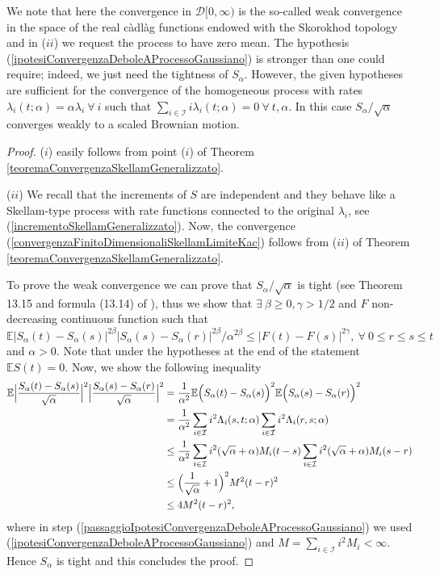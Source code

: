 \documentclass[12pt, twoside, english, headsepline]{article}
\theoremstyle{definition} %
\numberwithin{equation}{section} %
\begin{document}
We note that here the convergence in $\mathcal{D}[0,\infty)$ is the so-called weak convergence in the space of the real c\`{a}dl\`{a}g functions endowed with the Skorokhod topology and in ($ii$) we request the process to have zero mean. The hypothesis (\ref{ipotesiConvergenzaDeboleAProcessoGaussiano}) is stronger than one could require; indeed, we just need the tightness of $S_\alpha$. However, the given hypotheses are sufficient for the convergence of the homogeneous process with rates $\lambda_i(t;\alpha) = \alpha\lambda_i\ \forall\ i$ such that $\sum_{i\in\mathcal{I}} i \lambda_i(t;\alpha)=0\ \forall\ t,\alpha$. In this case $S_\alpha/\sqrt{\alpha}$ converges weakly to a scaled Brownian motion.

\begin{proof}
($i$) easily follows from point ($i$) of Theorem \ref{teoremaConvergenzaSkellamGeneralizzato}.

($ii$) We recall that the increments of $S$ are independent and they behave like a Skellam-type process with rate functions connected to the original $\lambda_i$, see (\ref{incrementoSkellamGeneralizzato}). Now, the convergence (\ref{convergenzaFinitoDimensionaliSkellamLimiteKac}) follows from ($ii$) of Theorem \ref{teoremaConvergenzaSkellamGeneralizzato}. 

To prove the weak convergence we can prove that $S_\alpha/\sqrt{\alpha}$ is tight (see Theorem 13.15 and formula (13.14) of \cite{B1999}), thus we show that $\exists \ \beta\ge0,\gamma>1/2$ and $F$ non-decreasing continuous function such that $\mathbb{E}\big|S_\alpha(t)-S_\alpha(s) \big|^{2\beta}\big|S_\alpha(s)-S_\alpha(r) \big|^{2\beta}/\alpha^{2\beta}\le \big|F(t)-F(s) \big|^{2\gamma},\ \forall\ 0\le r\le s\le t$ and $\alpha>0$. Note that under the hypotheses at the end of the statement $\mathbb{E}S(t) = 0$. Now, we show the following inequality
\begin{align}
\mathbb{E}\Big|\frac{S_\alpha(t)-S_\alpha(s) }{\sqrt{\alpha}}\Big|^{2}\Big|\frac{S_\alpha(s)-S_\alpha(r) }{\sqrt{\alpha}}\Big|^{2} &= \frac{1}{\alpha^2}\mathbb{E}\Bigl( S_\alpha(t)-S_\alpha(s)\Bigr)^2 \mathbb{E}\Bigl( S_\alpha(s)-S_\alpha(r)\Bigr)^2  \nonumber\\
& = \frac{1}{\alpha^2} \sum_{i\in\mathcal{I}} i^2 \Lambda_i(s,t;\alpha) \sum_{i\in\mathcal{I}} i^2 \Lambda_i(r,s;\alpha) \nonumber\\
& \le \frac{1}{\alpha^2} \sum_{i\in\mathcal{I}} i^2 (\sqrt{\alpha}+\alpha)M_i (t-s) \sum_{i\in\mathcal{I}} i^2 (\sqrt{\alpha}+\alpha) M_i (s-r)  \label{passaggioIpotesiConvergenzaDeboleAProcessoGaussiano} \\
& \le \Bigl(\frac{1}{\sqrt{\alpha}} +1\Bigr)^2 M^2(t-r)^2 \nonumber\\
& \le 4M^2(t-r)^2,\nonumber
\end{align}
where in step (\ref{passaggioIpotesiConvergenzaDeboleAProcessoGaussiano}) we used (\ref{ipotesiConvergenzaDeboleAProcessoGaussiano}) and $M = \sum_{i\in\mathcal{I}} i^2M_i<\infty$. Hence $S_\alpha$ is tight and this concludes the proof.
\end{proof}
\end{document}
